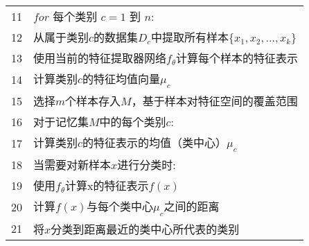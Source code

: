 \begin{table}[htbp]
\begin{tabularx}{1.0\textwidth}{cl}
		11 & \quad\quad $for$ 每个类别 $c=1$ 到 $n$:                                                                   \\
		12 & \quad\quad\quad\quad 从属于类别$c$的数据集$D_c$中提取所有样本$\{x_1, x_2, ..., x_k\}$                     \\
		13 & \quad\quad\quad\quad 使用当前的特征提取器网络$f_{\theta}$计算每个样本的特征表示                           \\
		14 & \quad\quad\quad\quad 计算类别$c$的特征均值向量$\mu_c$                                                     \\
		15 & \quad\quad\quad\quad 选择$m$个样本存入$M$，基于样本对特征空间的覆盖范围                                   \\
		16 & \quad\quad 对于记忆集$M$中的每个类别$c$:                                                                  \\
		17 & \quad\quad\quad\quad 计算类别$c$的特征表示的均值（类中心）$\mu_c$                                         \\
		18 & \quad\quad 当需要对新样本$x$进行分类时:                                                                   \\
		19 & \quad\quad\quad\quad 使用$f_{\theta}$计算x的特征表示$f(x)$                                                \\
		20 & \quad\quad\quad\quad 计算$f(x)$与每个类中心$\mu_c$之间的距离                                              \\
		21 & \quad\quad\quad\quad 将$x$分类到距离最近的类中心所代表的类别                                              \\
		\bottomrule
	\end{tabularx}
\end{table}
